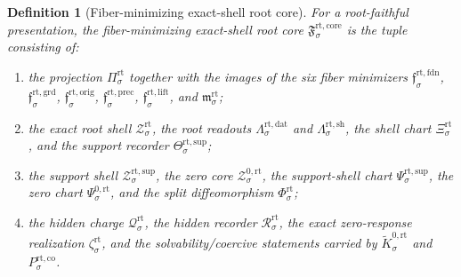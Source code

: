 \documentclass[11pt]{article}
\newcommand{\RootProj}[1]{\Pi_{#1}^{\mathrm{rt}}}
\newcommand{\RootFoundMin}[1]{\mathfrak f_{#1}^{\mathrm{rt,fdn}}}
\newcommand{\RootGroundMin}[1]{\mathfrak f_{#1}^{\mathrm{rt,grd}}}
\newcommand{\RootOrigMin}[1]{\mathfrak f_{#1}^{\mathrm{rt,orig}}}
\newcommand{\RootPrecMin}[1]{\mathfrak f_{#1}^{\mathrm{rt,prec}}}
\newcommand{\RootLiftMin}[1]{\mathfrak f_{#1}^{\mathrm{rt,lift}}}
\newcommand{\RootSubMin}[1]{\mathfrak m_{#1}^{\mathrm{rt}}}
\newcommand{\RootData}[1]{\Lambda_{#1}^{\mathrm{rt,dat}}}
\newcommand{\RootShellMap}[1]{\Lambda_{#1}^{\mathrm{rt,sh}}}
\newcommand{\RootShellSet}[1]{\mathcal Z_{#1}^{\mathrm{rt}}}
\newcommand{\RootChart}[1]{\Xi_{#1}^{\mathrm{rt}}}
\newcommand{\RootSupport}[1]{\Theta_{#1}^{\mathrm{rt,sup}}}
\newcommand{\RootSupportShell}[1]{\mathcal Z_{#1}^{\mathrm{rt,sup}}}
\newcommand{\RootZeroCore}[1]{\mathcal Z_{#1}^{0,\mathrm{rt}}}
\newcommand{\RootEqChart}[1]{\Psi_{#1}^{\mathrm{rt,sup}}}
\newcommand{\RootZeroChart}[1]{\Psi_{#1}^{0,\mathrm{rt}}}
\newcommand{\RootSplit}[1]{\Phi_{#1}^{\mathrm{rt}}}
\newcommand{\RootCharge}[1]{\mathcal Q_{#1}^{\mathrm{rt}}}
\newcommand{\RootResidual}[1]{\mathcal R_{#1}^{\mathrm{rt}}}
\newcommand{\RootEmbed}[1]{\zeta_{#1}^{\mathrm{rt}}}
\newcommand{\RootKernelCh}[1]{\widetilde K_{#1}^{0,\mathrm{rt}}}
\newcommand{\RootStateComp}[1]{P_{#1}^{\mathrm{rt,co}}}
\newcommand{\RootCore}[1]{\mathfrak F_{#1}^{\mathrm{rt,core}}}
\newtheorem{definition}{Definition}
\begin{document}
\begin{definition}[Fiber-minimizing exact-shell root core]
\label{def:core}
For a root-faithful presentation, the \emph{fiber-minimizing exact-shell root core} \(\RootCore{\sigma}\) is the tuple consisting of:
\begin{enumerate}
    \item the projection \(\RootProj{\sigma}\) together with the images of the six fiber minimizers \(\RootFoundMin{\sigma}\), \(\RootGroundMin{\sigma}\), \(\RootOrigMin{\sigma}\), \(\RootPrecMin{\sigma}\), \(\RootLiftMin{\sigma}\), and \(\RootSubMin{\sigma}\);
    \item the exact root shell \(\RootShellSet{\sigma}\), the root readouts \(\RootData{\sigma}\) and \(\RootShellMap{\sigma}\), the shell chart \(\RootChart{\sigma}\), and the support recorder \(\RootSupport{\sigma}\);
    \item the support shell \(\RootSupportShell{\sigma}\), the zero core \(\RootZeroCore{\sigma}\), the support-shell chart \(\RootEqChart{\sigma}\), the zero chart \(\RootZeroChart{\sigma}\), and the split diffeomorphism \(\RootSplit{\sigma}\);
    \item the hidden charge \(\RootCharge{\sigma}\), the hidden recorder \(\RootResidual{\sigma}\), the exact zero-response realization \(\RootEmbed{\sigma}\), and the solvability/coercive statements carried by \(\RootKernelCh{\sigma}\) and \(\RootStateComp{\sigma}\).
\end{enumerate}
\end{definition}
\end{document}
